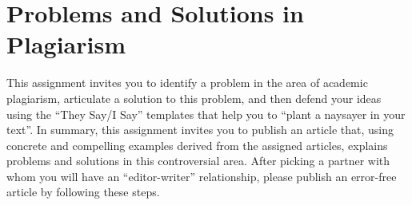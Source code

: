 \section*{Problems and Solutions in Plagiarism}

This assignment invites you to identify a problem in the area of academic plagiarism, articulate a solution to this
problem, and then defend your ideas using the ``They Say/I Say'' templates that help you to ``plant a naysayer in your
text''. In summary, this assignment invites you to publish an article that, using concrete and compelling examples
derived from the assigned articles, explains problems and solutions in this controversial area. After picking a partner
with whom you will have an ``editor-writer'' relationship, please publish an error-free article by following these
steps.

\vspace*{-.1in}

